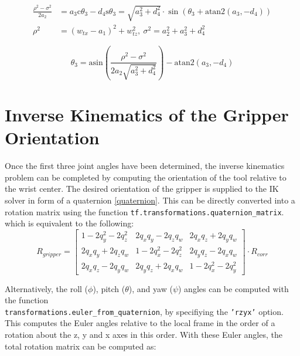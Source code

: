 \documentclass[twoside]{article}
\renewcommand{\c}{\text{c}}
\newcommand{\s}{\text{s}}
\newcommand{\code}[1]{\texttt{#1}}
\begin{document}
\begin{equation}
\begin{split}
  \frac{\rho^2 - \sigma^2}{2 a_2} &= a_3\c\theta_3 - d_4\s\theta_3 = \sqrt{a_3^2 + d_4^2} \cdot \sin(\theta_3 + \text{atan2}(a_3, -d_4))
  \\ \rho^2 &= (w_{tx} - a_1)^2 + w_{tz}^2, \ \sigma^2 = a_2^2 + a_3^2 + d_4^2
\end{split}
\end{equation}


\begin{equation}
  \theta_3 = \text{asin}\left(\frac{\rho^2 - \sigma^2}{2 a_2 \sqrt{a_3^2 + d_4^2}}\right) - \text{atan2}(a_3, -d_4)
\end{equation}

\section{Inverse Kinematics of the Gripper Orientation}
Once the first three joint angles have been determined, the inverse kinematics problem can be
completed by computing the orientation of the tool relative to the wrist center. The desired
orientation of the gripper is supplied to the IK solver in form of a quaternion \ref{quaternion}.
This can be directly converted into a rotation matrix using the function \code{tf.transformations.quaternion\_matrix}.
which is equivalent to the following:
\begin{equation}
  R_{gripper} =
  \begin{bmatrix}
    1 - 2 q_y^2 - 2 q_z^2	& 2 q_x q_y - 2 q_z q_w	& 2 q_x q_z + 2 q_y q_w \\
    2 q_x q_y + 2 q_z q_w	& 1 - 2 q_x^2 - 2 q_z^2	& 2 q_y q_z - 2 q_x q_w \\
    2 q_x q_z - 2 q_y q_w	& 2 q_y q_z + 2 q_x q_w	& 1 - 2 q_x^2 - 2 q_y^2
  \end{bmatrix}
  \cdot R_{corr}
\end{equation}

Alternatively, the roll ($\phi$), pitch ($\theta$), and yaw ($\psi$) angles can be computed with the function
\\ \code{transformations.euler\_from\_quaternion}, by specifiying the \code{'rzyx'} option.
This computes the Euler angles relative to the local frame in the order of a rotation about the
z, y and x axes in this order. With these Euler angles, the total rotation matrix can be computed as:
\end{document}
